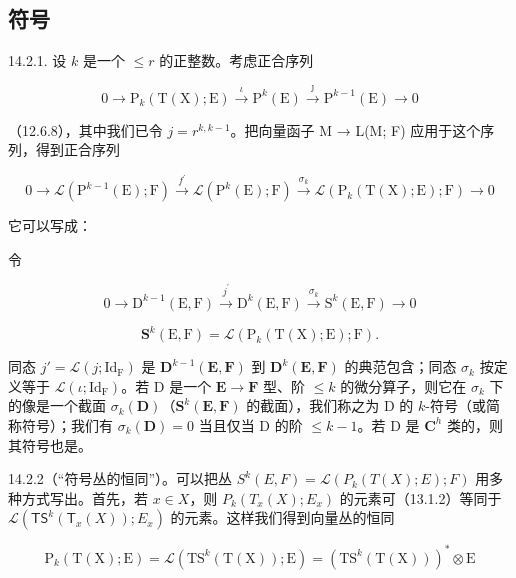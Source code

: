 \subsection{符号}

14.2.1. 设 \(k\) 是一个 \(\leqslant r\) 的正整数。考虑正合序列

\[
0 \rightarrow \mathrm{P} _ {k} (\mathrm{T} (\mathrm{X}); \mathrm{E}) \xrightarrow {\iota} \mathrm{P} ^ {k} (\mathrm{E}) \xrightarrow {\jmath} \mathrm{P} ^ {k - 1} (\mathrm{E}) \rightarrow 0
\]

（12.6.8），其中我们已令 \(j = r^{k, k-1}\)。把向量函子 M → L(M; F) 应用于这个序列，得到正合序列

\[
0 \rightarrow \mathscr {L} (\mathrm{P} ^ {k - 1} (\mathrm{E}); \mathrm{F}) \xrightarrow {f ^ {\prime}} \mathscr {L} (\mathrm{P} ^ {k} (\mathrm{E}); \mathrm{F}) \xrightarrow {\sigma_ {k}} \mathscr {L} (\mathrm{P} _ {k} (\mathrm{T} (\mathrm{X}); \mathrm{E}); \mathrm{F}) \rightarrow 0
\]

它可以写成：

令

\[
0 \rightarrow \mathrm{D} ^ {k - 1} (\mathrm{E}, \mathrm{F}) \xrightarrow {j ^ {\prime}} \mathrm{D} ^ {k} (\mathrm{E}, \mathrm{F}) \xrightarrow {\sigma_ {k}} \mathrm{S} ^ {k} (\mathrm{E}, \mathrm{F}) \rightarrow 0
\]

\[
\mathbf {S} ^ {k} (\mathrm{E}, \mathrm{F}) = \mathcal {L} (\mathrm{P} _ {k} (\mathrm{T} (\mathrm{X}); \mathrm{E}); \mathrm{F}).
\]

同态 \(j' = \mathcal{L}(j; \mathrm{Id}_{\mathrm{F}})\) 是 \(\mathbf{D}^{k-1}(\mathbf{E}, \mathbf{F})\) 到 \(\mathbf{D}^k(\mathbf{E}, \mathbf{F})\) 的典范包含；同态 \(\sigma_k\) 按定义等于 \(\mathcal{L}(\iota; \mathrm{Id}_{\mathrm{F}})\)。若 D 是一个 \(\mathbf{E} \to \mathbf{F}\) 型、阶 \(\leqslant k\) 的微分算子，则它在 \(\sigma_k\) 下的像是一个截面 \(\sigma_k(\mathbf{D})\)（\(\mathbf{S}^k(\mathbf{E}, \mathbf{F})\) 的截面），我们称之为 D 的 \(k\)-符号（或简称符号）；我们有 \(\sigma_k(\mathbf{D}) = 0\) 当且仅当 D 的阶 \(\leqslant k - 1\)。若 D 是 \(\mathbf{C}^h\) 类的，则其符号也是。

14.2.2（“符号丛的恒同”）。可以把丛 \(S^{k}(E, F) = \mathcal{L}(P_{k}(T(X); E); F)\) 用多种方式写出。首先，若 \(x \in X\)，则 \(P_{k}(T_{x}(X); E_{x})\) 的元素可（13.1.2）等同于 \(\mathcal{L}(\mathsf{T}\mathsf{S}^{k}(\mathsf{T}_{x}(X)); E_{x})\) 的元素。这样我们得到向量丛的恒同

\[
\mathrm{P} _ {k} (\mathrm{T} (\mathrm{X}); \mathrm{E}) = \mathscr {L} (\mathrm{TS} ^ {k} (\mathrm{T} (\mathrm{X})); \mathrm{E}) = (\mathrm{TS} ^ {k} (\mathrm{T} (\mathrm{X}))) ^ {*} \otimes \mathrm{E}
\]

